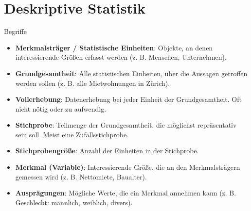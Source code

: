 \section{Deskriptive Statistik}\label{sec:deskriptive-statistik}

\begin{terms}{Begriffe}
    \\
    \begin{itemize}
        \item \textbf{Merkmalsträger / Statistische Einheiten}: Objekte, an denen interessierende Größen erfasst werden (z. B. Menschen, Unternehmen).
        \item \textbf{Grundgesamtheit}: Alle statistischen Einheiten, über die Aussagen getroffen werden sollen (z. B. alle Mietwohnungen in Zürich).
        \item \textbf{Vollerhebung}: Datenerhebung bei jeder Einheit der Grundgesamtheit. Oft nicht nötig oder zu aufwendig.
        \item \textbf{Stichprobe}: Teilmenge der Grundgesamtheit, die möglichst repräsentativ sein soll. Meist eine Zufallsstichprobe.
        \item \textbf{Stichprobengröße}: Anzahl der Einheiten in der Stichprobe.
        \item \textbf{Merkmal (Variable)}: Interessierende Größe, die an den Merkmalsträgern gemessen wird (z. B. Nettomiete, Baualter).
        \item \textbf{Ausprägungen}: Mögliche Werte, die ein Merkmal annehmen kann (z. B. Geschlecht: männlich, weiblich, divers).
    \end{itemize}
\end{terms}


